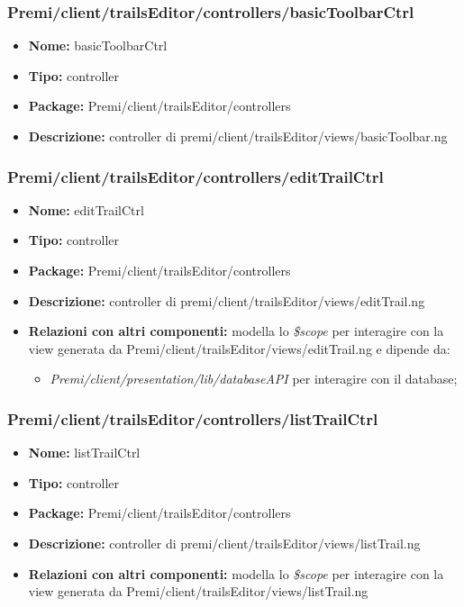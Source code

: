 \subsubsection{Premi/client/trailsEditor/controllers/basicToolbarCtrl}
\begin{itemize}
  \item[] \textbf{Nome:} basicToolbarCtrl
  \item[] \textbf{Tipo:} controller
  \item[] \textbf{Package:} Premi/client/trailsEditor/controllers
  \item[] \textbf{Descrizione:} controller di premi/client/trailsEditor/views/basicToolbar.ng   
\end{itemize}
\subsubsection{Premi/client/trailsEditor/controllers/editTrailCtrl}
\begin{itemize}
  \item[] \textbf{Nome:} editTrailCtrl
  \item[] \textbf{Tipo:} controller
  \item[] \textbf{Package:} Premi/client/trailsEditor/controllers
  \item[] \textbf{Descrizione:} controller di premi/client/trailsEditor/views/editTrail.ng
  \item[] \textbf{Relazioni con altri componenti:} modella lo \textit{\$scope} per interagire con la view generata da Premi/client/trailsEditor/views/editTrail.ng e dipende da:   
  \begin{itemize}
  \item[] \textit{Premi/client/presentation/lib/databaseAPI} per interagire con il database;    
  \end{itemize}
\end{itemize}
\subsubsection{Premi/client/trailsEditor/controllers/listTrailCtrl}
\begin{itemize}
  \item[] \textbf{Nome:} listTrailCtrl
  \item[] \textbf{Tipo:} controller
  \item[] \textbf{Package:} Premi/client/trailsEditor/controllers
  \item[] \textbf{Descrizione:} controller di premi/client/trailsEditor/views/listTrail.ng
  \item[] \textbf{Relazioni con altri componenti:} modella lo \textit{\$scope} per interagire con la view generata da Premi/client/trailsEditor/views/listTrail.ng
\end{itemize}
